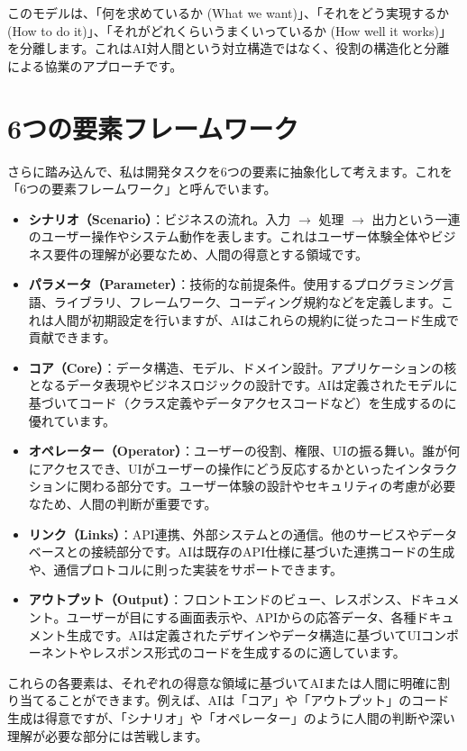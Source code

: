 \documentclass{article}
\begin{document}
このモデルは、「何を求めているか (What we want)」、「それをどう実現するか (How to do it)」、「それがどれくらいうまくいっているか (How well it works)」を分離します。これはAI対人間という対立構造ではなく、役割の構造化と分離による協業のアプローチです。

\section{6つの要素フレームワーク}

さらに踏み込んで、私は開発タスクを6つの要素に抽象化して考えます。これを「6つの要素フレームワーク」と呼んでいます。

\begin{itemize}
    \item \textbf{シナリオ（Scenario）}：ビジネスの流れ。入力 $\rightarrow$ 処理 $\rightarrow$ 出力という一連のユーザー操作やシステム動作を表します。これはユーザー体験全体やビジネス要件の理解が必要なため、人間の得意とする領域です。
    \item \textbf{パラメータ（Parameter）}：技術的な前提条件。使用するプログラミング言語、ライブラリ、フレームワーク、コーディング規約などを定義します。これは人間が初期設定を行いますが、AIはこれらの規約に従ったコード生成で貢献できます。
    \item \textbf{コア（Core）}：データ構造、モデル、ドメイン設計。アプリケーションの核となるデータ表現やビジネスロジックの設計です。AIは定義されたモデルに基づいてコード（クラス定義やデータアクセスコードなど）を生成するのに優れています。
    \item \textbf{オペレーター（Operator）}：ユーザーの役割、権限、UIの振る舞い。誰が何にアクセスでき、UIがユーザーの操作にどう反応するかといったインタラクションに関わる部分です。ユーザー体験の設計やセキュリティの考慮が必要なため、人間の判断が重要です。
    \item \textbf{リンク（Links）}：API連携、外部システムとの通信。他のサービスやデータベースとの接続部分です。AIは既存のAPI仕様に基づいた連携コードの生成や、通信プロトコルに則った実装をサポートできます。
    \item \textbf{アウトプット（Output）}：フロントエンドのビュー、レスポンス、ドキュメント。ユーザーが目にする画面表示や、APIからの応答データ、各種ドキュメント生成です。AIは定義されたデザインやデータ構造に基づいてUIコンポーネントやレスポンス形式のコードを生成するのに適しています。
\end{itemize}

これらの各要素は、それぞれの得意な領域に基づいてAIまたは人間に明確に割り当てることができます。例えば、AIは「コア」や「アウトプット」のコード生成は得意ですが、「シナリオ」や「オペレーター」のように人間の判断や深い理解が必要な部分には苦戦します。
\end{document}
